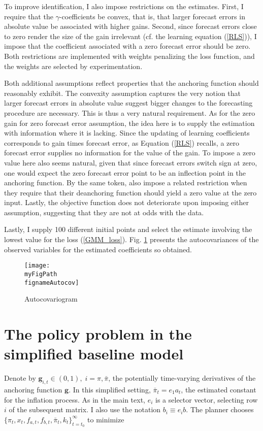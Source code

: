 \documentclass[11pt]{article}
\def \myFigPath {../../figures/}
\renewcommand{\[}{\begin{equation}}
\renewcommand{\]}{\end{equation}}
\def\fignameAutocov{autocovariogram_N_100_nfe_5_gridspacing_manual_Wdiffs2_100000_Wmid_1000_Nsimulations_command_sigmas_17_Sep_2020_12_05_56}
\begin{document}
To improve identification, I also impose restrictions on the estimates. First, I require that the $\gamma$-coefficients be convex, that is, that larger forecast errors in absolute value be associated with higher gains. Second, since forecast errors close to zero render the size of the gain irrelevant (cf. the learning equation (\ref{RLS})), I impose that the coefficient associated with a zero forecast error should be zero. Both restrictions are implemented with weights penalizing the loss function, and the weights are selected by experimentation. 

Both additional assumptions reflect properties that the anchoring function should reasonably exhibit. The convexity assumption captures the very notion that larger forecast errors in absolute value suggest bigger changes to the forecasting procedure are necessary. This is thus a very natural requirement. As for the zero gain for zero forecast error assumption, the idea here is to supply the estimation with information where it is lacking. Since the updating of learning coefficients corresponds to gain times forecast error, as Equation (\ref{RLS}) recalls, a zero forecast error supplies no information for the value of the gain. To impose a zero value here also seems natural, given that since forecast errors switch sign at zero, one would expect the zero forecast error point to be an inflection point in the anchoring function. By the same token, \cite{gobbi2019monetary} also impose a related restriction when they require that their deanchoring function should yield a zero value at the zero input. Lastly, the objective function does not deteriorate upon imposing either assumption, suggesting that they are not at odds with the data.

Lastly, I supply 100 different initial points and select the estimate involving the lowest value for the loss (\ref{GMM_loss}). Fig. \ref{autocovariogram} presents the autocovariances of the observed variables for the estimated coefficients so obtained.


\begin{figure}[h!]
\texttt{[image: \\myFigPath \\fignameAutocov]}
\caption{Autocovariogram}
\label{autocovariogram}
\end{figure}

\section{The policy problem in the simplified baseline model }\label{app_midsimple_problem}
Denote by $\mathbf{g}_{i,t} \in (0,1), \; i=\pi, \bar{\pi}$, the potentially time-varying derivatives of the anchoring function $\mathbf{g}$. In this simplified setting, $\bar{\pi}_t = e_1 a_t$, the estimated constant for the inflation process. As in the main text, $e_i$ is a selector vector, selecting row $i$ of the subsequent matrix. I also use the notation $b_i \equiv e_i b$.   The planner chooses $\{\pi_t, x_t, f_{a,t},  f_{b,t}, \bar{\pi}_t, k_t\}_{t=t_0}^{\infty}$ to minimize
\end{document}
